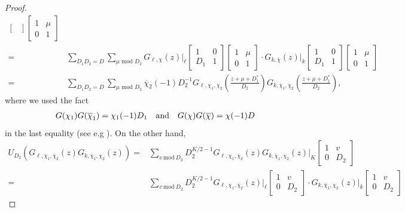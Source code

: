 \documentclass[11pt,letterpaper,reqno]{amsart}
\numberwithin{figure}{section}
\numberwithin{table}{section}
\theoremstyle{definition}
\theoremstyle{plain}
\theoremstyle{definition}
\theoremstyle{definition}
\theoremstyle{remark}
\numberwithin{equation}{section}
\theoremstyle{remark}
\begin{document}
\begin{proof}
\begin{align*}
\begin{bmatrix}
        \end{bmatrix}\begin{bmatrix}
            1 & \mu \\ 0 & 1
        \end{bmatrix}    \nonumber\\
        =&\sum_{D_1D_2=D}\sum_{\mu \text{ mod } D_2}G_{\ell,\chi}(z)\bigg|_{\ell}\begin{bmatrix}
            1 & 0 \\ D_1 & 1
\end{bmatrix}\begin{bmatrix}
            1 & \mu \\ 0 & 1
        \end{bmatrix}\cdot G_{k,\overline{\chi}}(z)\bigg|_{k}\begin{bmatrix}
            1 & 0 \\ D_1 & 1
        \end{bmatrix}\begin{bmatrix}
            1 & \mu \\ 0 & 1
        \end{bmatrix}   \nonumber\\
        =&\sum_{D_1D_2=D}\sum_{\mu \text{ mod } D_2}\overline{\chi}_2(-1)D_2^{-1}G_{\ell,\chi_1,\overline{\chi}_{2}}\left(\frac{z+\mu+D_1^*}{D_2}\right)G_{k,\overline{\chi}_{1},\chi_2}\left(\frac{z+\mu+D_1^*}{D_2}\right),   \nonumber
    \end{align*}
where we used the fact
\begin{align*}G(\chi_{1})G(\overline{\chi}_{1})=\chi_1(-1)D_1\quad {\rm and}\quad G(\chi)G(\overline{\chi})=\chi(-1)D\end{align*} in the last equality (see e.g \cite[Corollary 2.1.47 on p.~33]{Cohenbook}). On the other hand,
    \begin{align*}
U_{D_2}\left(G_{\ell,\chi_1,\overline{\chi}_{2}}(z)G_{k,\overline{\chi}_{1},\chi_2}(z)\right)
        =&\sum_{v~\text{mod}~D_2}D_2^{K/2-1}G_{\ell,\chi_1,\overline{\chi}_{2}}(z)G_{k,\overline{\chi}_{1},\chi_2}(z)\bigg|_{K}\begin{bmatrix}
            1 & v\\ 0 & D_2
        \end{bmatrix}\\=&\sum_{v~\text{mod}~D_2}D_2^{K/2-1}G_{\ell,\chi_1,\overline{\chi}_{2}}(z)\bigg|_{\ell}\begin{bmatrix}
            1 & v\\ 0 & D_2
\end{bmatrix}\cdot G_{k,\overline{\chi}_{1},\chi_2}(z)\bigg|_k\begin{bmatrix}1 & v\\ 0 & D_2

\end{bmatrix}
\end{align*}
\end{proof}
\end{document}
